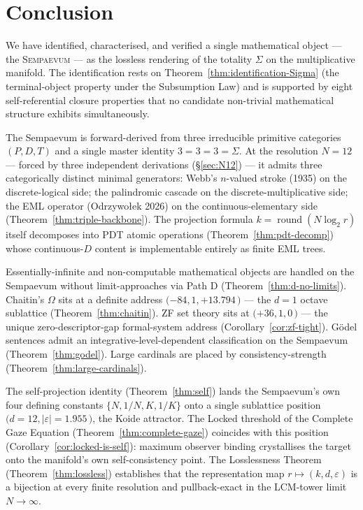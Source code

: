 \documentclass[11pt,a4paper]{article}
\theoremstyle{definition}
\theoremstyle{remark}
\DeclareMathOperator{\round}{round}
\newcommand{\Sempaevum}{\textsc{Sempaevum}}
\begin{document}
\section{Conclusion}\label{sec:conclusion}

We have identified, characterised, and verified a single mathematical object --- the \Sempaevum{} --- as the lossless rendering of the totality $\Sigma$ on the multiplicative manifold. The identification rests on Theorem~\ref{thm:identification-Sigma} (the terminal-object property under the Subsumption Law) and is supported by eight self-referential closure properties that no candidate non-trivial mathematical structure exhibits simultaneously.

The Sempaevum is forward-derived from three irreducible primitive categories $(P,D,T)$ and a single master identity $3=3=3=\Sigma$. At the resolution $N=12$ --- forced by three independent derivations (\S\ref{sec:N12}) --- it admits three categorically distinct minimal generators: Webb's $n$-valued stroke (1935) on the discrete-logical side; the palindromic cascade on the discrete-multiplicative side; the EML operator (Odrzywo{\l}ek 2026) on the continuous-elementary side (Theorem~\ref{thm:triple-backbone}). The projection formula $k=\round(N\log_{2}r)$ itself decomposes into PDT atomic operations (Theorem~\ref{thm:pdt-decomp}) whose continuous-$D$ content is implementable entirely as finite EML trees.

Essentially-infinite and non-computable mathematical objects are handled on the Sempaevum without limit-approaches via Path D (Theorem~\ref{thm:d-no-limits}). Chaitin's $\Omega$ sits at a definite address $(-84, 1, +13.794$\,\textcent$)$ --- the $d=1$ octave sublattice (Theorem~\ref{thm:chaitin}). ZF set theory sits at $(+36, 1, 0$\,\textcent$)$ --- the unique zero-descriptor-gap formal-system address (Corollary~\ref{cor:zf-tight}). G\"odel sentences admit an integrative-level-dependent classification on the Sempaevum (Theorem~\ref{thm:godel}). Large cardinals are placed by consistency-strength (Theorem~\ref{thm:large-cardinals}).

The self-projection identity (Theorem~\ref{thm:self}) lands the Sempaevum's own four defining constants $\{N, 1/N, K, 1/K\}$ onto a single sublattice position $(d=12, |\varepsilon|=1.955$\,\textcent$)$, the Koide attractor. The Locked threshold of the Complete Gaze Equation (Theorem~\ref{thm:complete-gaze}) coincides with this position (Corollary~\ref{cor:locked-is-self}): maximum observer binding crystallises the target onto the manifold's own self-consistency point. The Losslessness Theorem (Theorem~\ref{thm:lossless}) establishes that the representation map $r\mapsto(k,d,\varepsilon)$ is a bijection at every finite resolution and pullback-exact in the LCM-tower limit $N\to\infty$.
\end{document}
